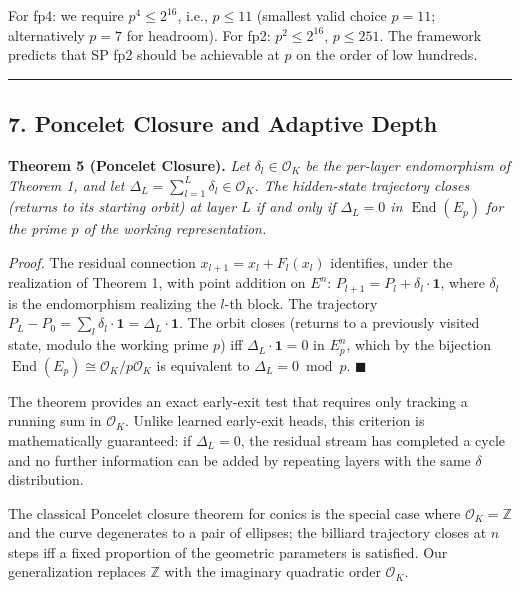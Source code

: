 \documentclass[
  11pt,
]{article}
\begin{document}
For fp4: we require \(p^4 \leq 2^{16}\), i.e., \(p \leq 11\) (smallest
valid choice \(p = 11\); alternatively \(p = 7\) for headroom). For fp2:
\(p^2 \leq 2^{16}\), \(p \leq 251\). The framework predicts that SP fp2
should be achievable at \(p\) on the order of low hundreds.

\begin{center}\rule{0.5\linewidth}{0.5pt}\end{center}

\hypertarget{poncelet-closure-and-adaptive-depth}{%
\subsection{7. Poncelet Closure and Adaptive
Depth}\label{poncelet-closure-and-adaptive-depth}}

\textbf{Theorem 5 (Poncelet Closure).} \emph{Let
\(\delta_l \in \mathcal{O}_K\) be the per-layer endomorphism of Theorem
1, and let \(\Delta_L = \sum_{l=1}^L \delta_l \in \mathcal{O}_K\). The
hidden-state trajectory closes (returns to its starting orbit) at layer
\(L\) if and only if \(\Delta_L = 0\) in \(\operatorname{End}(E_p)\) for
the prime \(p\) of the working representation.}

\emph{Proof.} The residual connection \(x_{l+1} = x_l + F_l(x_l)\)
identifies, under the realization of Theorem 1, with point addition on
\(E^n\): \(P_{l+1} = P_l + \delta_l \cdot \mathbf{1}\), where
\(\delta_l\) is the endomorphism realizing the \(l\)-th block. The
trajectory
\(P_L - P_0 = \sum_l \delta_l \cdot \mathbf{1} = \Delta_L \cdot \mathbf{1}\).
The orbit closes (returns to a previously visited state, modulo the
working prime \(p\)) iff \(\Delta_L \cdot \mathbf{1} = 0\) in \(E_p^n\),
which by the bijection
\(\operatorname{End}(E_p) \cong \mathcal{O}_K / p\mathcal{O}_K\) is
equivalent to \(\Delta_L = 0 \bmod p\). \(\blacksquare\)

The theorem provides an exact early-exit test that requires only
tracking a running sum in \(\mathcal{O}_K\). Unlike learned early-exit
heads, this criterion is mathematically guaranteed: if \(\Delta_L = 0\),
the residual stream has completed a cycle and no further information can
be added by repeating layers with the same \(\delta\) distribution.

The classical Poncelet closure theorem for conics is the special case
where \(\mathcal{O}_K = \mathbb{Z}\) and the curve degenerates to a pair
of ellipses; the billiard trajectory closes at \(n\) steps iff a fixed
proportion of the geometric parameters is satisfied. Our generalization
replaces \(\mathbb{Z}\) with the imaginary quadratic order
\(\mathcal{O}_K\).
\end{document}
